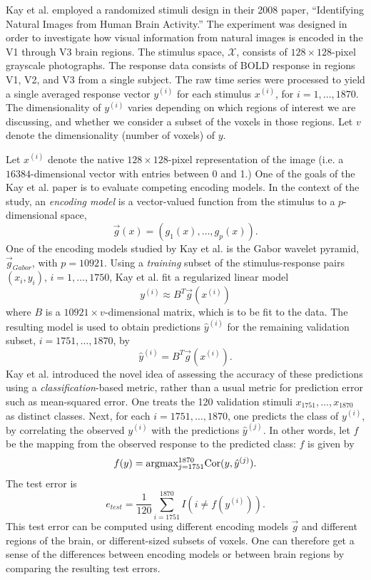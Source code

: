 \documentclass[12pt]{article}
\begin{document}
Kay et al. employed a randomized stimuli design in their 2008 paper,
``Identifying Natural Images from Human Brain Activity.''  The
experiment was designed in order to investigate how visual information
from natural images is encoded in the V1 through V3 brain regions.
The stimulus space, $\mathcal{X}$, consists of $128 \times 128$-pixel
grayscale photographs.  The response data consists of BOLD response in
regions V1, V2, and V3 from a single subject.  The raw time series were
processed to yield a single averaged response vector $y^{(i)}$ for each
stimulus $x^{(i)}$, for $i = 1,\hdots, 1870$.
The dimensionality of $y^{(i)}$ varies depending on which regions of interest
we are discussing, and whether we consider a subset of the voxels in those regions.
Let $v$ denote the dimensionality (number of voxels) of $y$.

Let $x^{(i)}$ denote the native $128 \times 128$-pixel representation
of the image (i.e. a $16384$-dimensional vector with entries between 0
and 1.)  One of the goals of the Kay et al. paper is to evaluate
competing encoding models.  In the context of the study,
an \emph{encoding model} is a vector-valued function from the stimulus
to a $p$-dimensional space,
\[
\vec{g}(x) = (g_1(x),\hdots, g_{p}(x)).
\]
One of the encoding models studied by Kay et al. is the Gabor wavelet pyramid,
$\vec{g}_{Gabor}$, with $p = 10921$.
Using a \emph{training} subset of the stimulus-response pairs $(x_i, y_i)$, $i = 1,\hdots, 1750$,
Kay et al. fit a regularized linear model
\[
y^{(i)} \approx B^T \vec{g}(x^{(i)})
\]
where $B$ is a $10921 \times v$-dimensional matrix, which is to be fit to the data.
The resulting model is used to obtain predictions $\hat{y}^{(i)}$ for the remaining validation subset,
$i = 1751,\hdots, 1870$,
by
\[
\hat{y}^{(i)} = B^T \vec{g}(x^{(i)}).
\]
Kay et al. introduced the novel idea of assessing the accuracy of
these predictions using a \emph{classification}-based metric, rather
than a usual metric for prediction error such as mean-squared error.
One treats the 120 validation stimuli $x_{1751},\hdots, x_{1870}$ as distinct classes.
Next, for each $i = 1751, \hdots, 1870$, one predicts the class of $y^{(i)}$,
by correlating the observed $y^{(i)}$ with the predictions $\hat{y}^{(j)}$.
In other words, let $f$ be the mapping from the observed response to the predicted class:
$f$ is given by
\[
f(y) = \text{argmax}_{j =1751}^{1870} \text{Cor}(y, \hat{y}^{(j)}).
\]
The test error is
\[
e_{test} = \frac{1}{120} \sum_{i=1751}^{1870} I(i \neq f(y^{(i)})).
\]
This test error can be computed using different encoding models
$\vec{g}$ and different regions of the brain, or different-sized
subsets of voxels.
One can therefore get a sense of the differences between encoding models
or between brain regions by comparing the resulting test errors.
\end{document}
